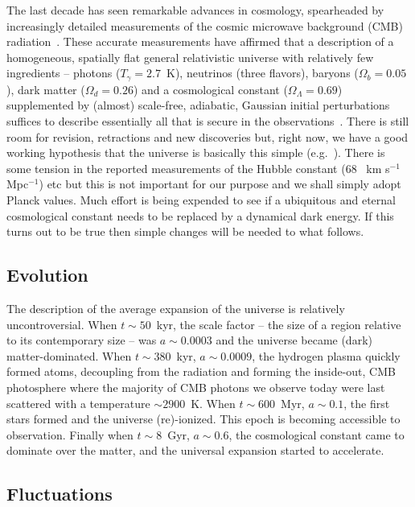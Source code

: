 \documentclass[psfig,11pt]{article}
\begin{document}
The last decade has seen remarkable advances in cosmology, spearheaded by increasingly detailed measurements of the cosmic microwave background (CMB) radiation~\cite{Planck2015maps}. These accurate measurements have affirmed that a description of a homogeneous, spatially flat general relativistic universe with relatively few ingredients -- photons ($T_\gamma=2.7$~K), neutrinos (three flavors), baryons ($\Omega_b=0.05$), dark matter ($\Omega_d=0.26$) and a cosmological constant ($\Omega_\Lambda=0.69$) supplemented by (almost) scale-free, adiabatic, Gaussian initial perturbations suffices to describe essentially all that is secure in the observations~\cite{Planck2015cosmopara}. There is still room for revision, retractions and new discoveries but, right now, we have a good working hypothesis that the universe is basically this simple (e.g.~\cite{Weinberg2008, Schneider2015}). There is some tension in the reported measurements of the Hubble constant (68 ~km s$^{-1}$ Mpc$^{-1}$) etc but this is not important for our purpose and we shall simply adopt Planck values. Much effort is being expended to see if a ubiquitous and eternal cosmological constant needs to be replaced by a dynamical dark energy. If this turns out to be true then simple changes will be needed to what follows.

\subsection{Evolution}

The description of the average expansion of the universe is relatively uncontroversial. When  $t\sim 50$~kyr,  the scale factor -- the size of a region relative to its contemporary size -- was $a\sim0.0003$ and the universe became (dark) matter-dominated. When $t\sim380$~kyr, $a\sim0.0009$, the hydrogen plasma quickly formed atoms, decoupling from the radiation and forming the inside-out, CMB photosphere where the majority of CMB photons we observe today were last scattered with a temperature $\sim2900$~K. When $t\sim600$~Myr, $a\sim0.1$, the first stars formed and the universe (re)-ionized. This epoch is becoming accessible to observation. Finally when $t\sim8$~Gyr, $a\sim0.6$, the cosmological constant came to dominate over the matter, and the universal expansion started to accelerate.

\subsection{Fluctuations}
\end{document}
